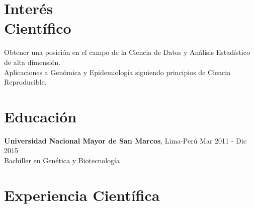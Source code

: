 \documentclass[margin,line]{res}
\begin{document}
	
	\address{Calle Tambo Huascar 201, San Miguel, Lima-Perú}
	\address{\textit{contacto:} avallecam@gmail.com o (+51)950951722}
	
	\begin{resume}
		
		\vspace*{.15in}
		
		\section{\sc Interés \\Científico}
		
		Obtener una posición en el campo de la Ciencia de Datos y Análisis Estadístico de alta dimensión.\\
		Aplicaciones a Genómica y Epidemiología siguiendo principios de Ciencia Reproducible.\\ 
		
		\section{\sc Educación}
		{\bf Universidad Nacional Mayor de San Marcos}, Lima-Perú \hfill Mar 2011 - Dic 2015\\
		Bachiller en Genética y Biotecnología\\
		
		\section{\sc Experiencia Científica}
		

\end{resume}
\end{document}
